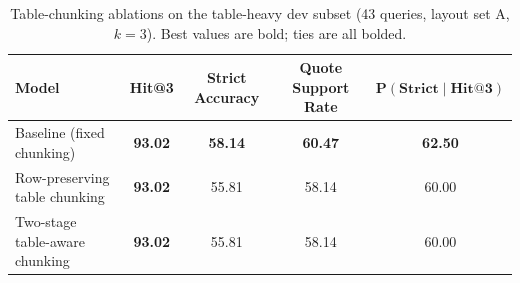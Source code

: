 \begin{table}[t]
\centering
\small
\setlength{\tabcolsep}{6pt}
\caption{Table-chunking ablations on the table-heavy dev subset (43 queries, layout set A, $k=3$). Best values are bold; ties are all bolded.}
\label{tab:table_chunking_ablation_tableheavy_rag_style}
\begin{tabular}{lcccc}
\toprule
\textbf{Model} &
\textbf{Hit@3} &
\textbf{Strict Accuracy} &
\textbf{Quote Support Rate} &
$\mathbf{P(\text{Strict} \mid \text{Hit@3})}$ \\
\midrule
Baseline (fixed chunking)                & \textbf{93.02} & \textbf{58.14} & \textbf{60.47} & \textbf{62.50} \\
Row-preserving table chunking            & \textbf{93.02} & 55.81          & 58.14          & 60.00          \\
Two-stage table-aware chunking           & \textbf{93.02} & 55.81          & 58.14          & 60.00          \\
\bottomrule
\end{tabular}
\end{table}

